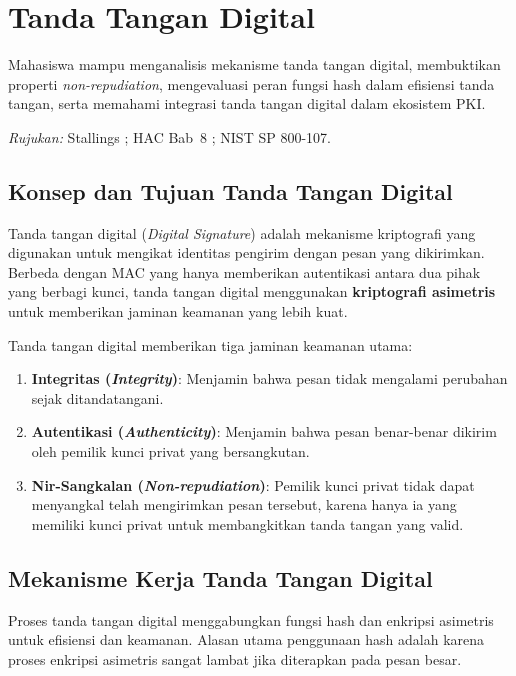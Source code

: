 \section{Tanda Tangan Digital}

\begin{subcpmk}
  \item Mahasiswa mampu menganalisis mekanisme tanda tangan digital, membuktikan properti \textit{non-repudiation}, mengevaluasi peran fungsi hash dalam efisiensi tanda tangan, serta memahami integrasi tanda tangan digital dalam ekosistem PKI.
\end{subcpmk}

\noindent\textit{Rujukan:} Stallings \cite{stallings2017}; HAC Bab~8 \cite{hac_online}; NIST SP 800-107.

\subsection{Konsep dan Tujuan Tanda Tangan Digital}

Tanda tangan digital (\textit{Digital Signature}) adalah mekanisme kriptografi yang digunakan untuk mengikat identitas pengirim dengan pesan yang dikirimkan. Berbeda dengan MAC yang hanya memberikan autentikasi antara dua pihak yang berbagi kunci, tanda tangan digital menggunakan \textbf{kriptografi asimetris} untuk memberikan jaminan keamanan yang lebih kuat.

Tanda tangan digital memberikan tiga jaminan keamanan utama:
\begin{enumerate}
    \item \textbf{Integritas (\textit{Integrity})}: Menjamin bahwa pesan tidak mengalami perubahan sejak ditandatangani.
    \item \textbf{Autentikasi (\textit{Authenticity})}: Menjamin bahwa pesan benar-benar dikirim oleh pemilik kunci privat yang bersangkutan.
    \item \textbf{Nir-Sangkalan (\textit{Non-repudiation})}: Pemilik kunci privat tidak dapat menyangkal telah mengirimkan pesan tersebut, karena hanya ia yang memiliki kunci privat untuk membangkitkan tanda tangan yang valid.
\end{enumerate}

\subsection{Mekanisme Kerja Tanda Tangan Digital}

Proses tanda tangan digital menggabungkan fungsi hash dan enkripsi asimetris untuk efisiensi dan keamanan. Alasan utama penggunaan hash adalah karena proses enkripsi asimetris sangat lambat jika diterapkan pada pesan besar.


